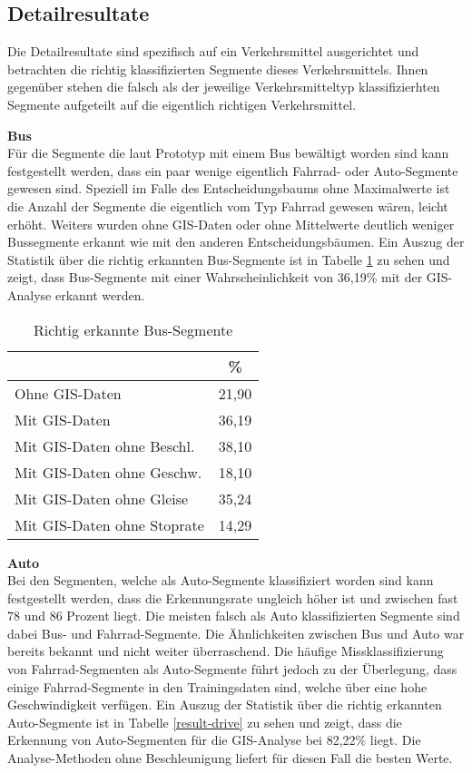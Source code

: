 \subsection{Detailresultate}
Die Detailresultate sind spezifisch auf ein Verkehrsmittel ausgerichtet und betrachten die richtig klassifizierten Segmente dieses Verkehrsmittels. Ihnen gegenüber stehen die falsch als der jeweilige Verkehrsmitteltyp klassifizierhten Segmente aufgeteilt auf die eigentlich richtigen Verkehrsmittel.

\textbf{Bus} \\
Für die Segmente die laut Prototyp mit einem Bus bewältigt worden sind kann festgestellt werden, dass ein paar wenige eigentlich Fahrrad- oder Auto-Segmente gewesen sind. Speziell im Falle des Entscheidungsbaums ohne Maximalwerte ist die Anzahl der Segmente die eigentlich vom Typ Fahrrad gewesen wären, leicht erhöht. Weiters wurden ohne GIS-Daten oder ohne Mittelwerte deutlich weniger Bussegmente erkannt wie mit den anderen Entscheidungsbäumen. Ein Auszug der Statistik über die richtig erkannten Bus-Segmente ist in Tabelle \ref{result-bus} zu sehen und zeigt, dass Bus-Segmente mit einer Wahrscheinlichkeit von 36,19\% mit der GIS-Analyse erkannt werden.

\begin{table}[h]
\centering
\begin{tabular}{|l|c|}
\hline
 & \% \\ \hline
Ohne GIS-Daten & 21,90 \\ \hline
Mit GIS-Daten & 36,19 \\ \hline
Mit GIS-Daten ohne Beschl. & 38,10 \\ \hline
Mit GIS-Daten ohne Geschw. & 18,10 \\ \hline
Mit GIS-Daten ohne Gleise & 35,24 \\ \hline
Mit GIS-Daten ohne Stoprate & 14,29 \\ \hline
\end{tabular}
\caption{Richtig erkannte Bus-Segmente}
\label{result-bus}
\end{table}

\textbf{Auto} \\
Bei den Segmenten, welche als Auto-Segmente klassifiziert worden sind kann festgestellt werden, dass die Erkennungsrate ungleich höher ist und zwischen fast 78 und 86 Prozent liegt. Die meisten falsch als Auto klassifizierten Segmente sind dabei Bus- und Fahrrad-Segmente. Die Ähnlichkeiten zwischen Bus und Auto war bereits bekannt und nicht weiter überraschend. Die häufige Missklassifizierung von Fahrrad-Segmenten als Auto-Segmente führt jedoch zu der Überlegung, dass einige Fahrrad-Segmente in den Trainingsdaten sind, welche über eine hohe Geschwindigkeit verfügen. Ein Auszug der Statistik über die richtig erkannten Auto-Segmente ist in Tabelle \ref{result-drive} zu sehen und zeigt, dass die Erkennung von Auto-Segmenten für die GIS-Analyse bei 82,22\% liegt. Die Analyse-Methoden ohne Beschleunigung liefert für diesen Fall die besten Werte.

